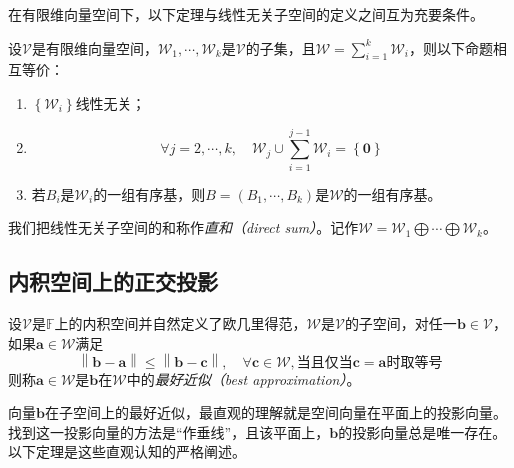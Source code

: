 \documentclass[main.tex]{subfiles}
\begin{document}
在有限维向量空间下，以下定理与线性无关子空间的定义之间互为充要条件。
\begin{theorem}\label{thm:A.2}
    设$\mathcal{V}$是有限维向量空间，$\mathcal{W}_1,\cdots,\mathcal{W}_k$是$\mathcal{V}$的子集，且$\mathcal{W}=\sum_{i=1}^k\mathcal{W}_i$，则以下命题相互等价：
    \begin{enumerate}
        \item $\left\{\mathcal{W}_i\right\}$线性无关；
        \item \[\forall j=2,\cdots,k,\quad\mathcal{W}_j\cup\sum_{i=1}^{j-1}\mathcal{W}_i=\left\{\mathbf{0}\right\}\]
        \item 若$B_i$是$\mathcal{W}_i$的一组有序基，则$B=\left(B_1,\cdots,B_k\right)$是$\mathcal{W}$的一组有序基。
    \end{enumerate}
\end{theorem}

我们把线性无关子空间的和称作\emph{直和（direct sum）}。记作$\mathcal{W}=\mathcal{W}_1\bigoplus\cdots\bigoplus\mathcal{W}_k$。



\subsection{内积空间上的正交投影}
\begin{definition}[最好近似]\label{def:A.3}
    设$\mathcal{V}$是$\mathbb{F}$上的内积空间并自然定义了欧几里得范，$\mathcal{W}$是$\mathcal{V}$的子空间，对任一$\mathbf{b}\in\mathcal{V}$，如果$\mathbf{a}\in\mathcal{W}$满足
    \[\left\|\mathbf{b}-\mathbf{a}\right\|\leq\left\|\mathbf{b}-\mathbf{c}\right\|,\quad\forall\mathbf{c}\in\mathcal{W},\text{当且仅当$\mathbf{c}=\mathbf{a}$时取等号}\]
    则称$\mathbf{a}\in\mathcal{W}$是$\mathbf{b}$在$\mathcal{W}$中的\emph{最好近似（best approximation）}。
\end{definition}

向量$\mathbf{b}$在子空间上的最好近似，最直观的理解就是空间向量在平面上的投影向量。找到这一投影向量的方法是“作垂线”，且该平面上，$\mathbf{b}$的投影向量总是唯一存在。以下定理是这些直观认知的严格阐述。
\end{document}
